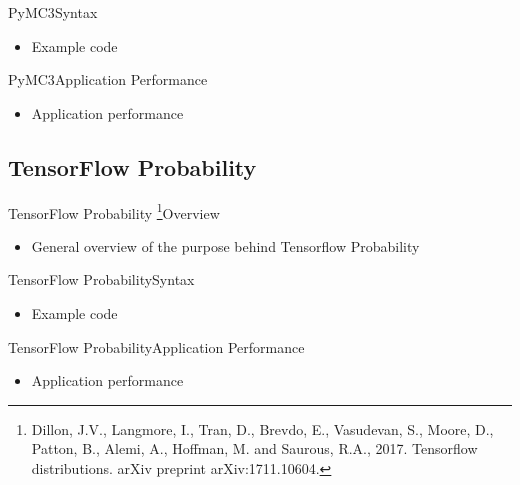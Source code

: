 \documentclass[AERbeamer%
              ,optEnglish%
              ,optBiber%
              ,optBibstyleAlphabetic%
              ,optBeamerClassicFormat%
              ]{AERlatex}%
\begin{document}
\begin{frame}[c]{PyMC3}{Syntax}
    \centering
    \begin{itemize}
        \item Example code
    \end{itemize}
\end{frame}


\begin{frame}[c]{PyMC3}{Application Performance}
    \centering
    \begin{itemize}
        \item Application performance
    \end{itemize}
\end{frame}


\subsection{TensorFlow Probability}
\begin{frame}[c]{TensorFlow Probability \footnote{Dillon, J.V., Langmore, I., Tran, D., Brevdo, E., Vasudevan, S.,
                                                  Moore, D., Patton, B., Alemi, A., Hoffman, M. and Saurous, R.A., 2017.
                                                  Tensorflow distributions. arXiv preprint arXiv:1711.10604.}}{Overview}
    \centering
    \begin{itemize}
        \item General overview of the purpose behind Tensorflow Probability
    \end{itemize}
\end{frame}


\begin{frame}[c]{TensorFlow Probability}{Syntax}
    \centering
    \begin{itemize}
        \item Example code
    \end{itemize}
\end{frame}


\begin{frame}[c]{TensorFlow Probability}{Application Performance}
    \centering
    \begin{itemize}
        \item Application performance
    \end{itemize}
\end{frame}
\end{document}
